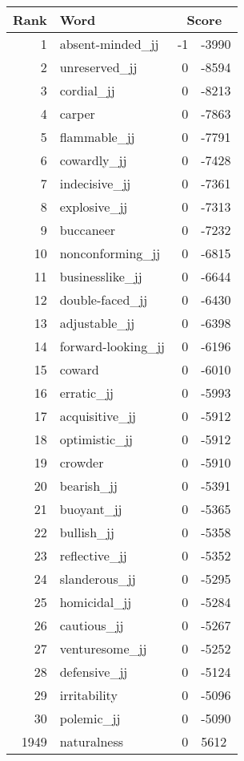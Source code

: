 \begin{longtable}[!htbp]{| rlr@{.}l |}
    \hline
    \textbf{Rank} & \textbf{Word} & \multicolumn{2}{c|}{\textbf{Score}} \\
    \hline
    \endhead
    1 & absent-minded\_jj & -1 & -3990 \\
    2 & unreserved\_jj & 0 & -8594 \\
    3 & cordial\_jj & 0 & -8213 \\
    4 & carper & 0 & -7863 \\
    5 & flammable\_jj & 0 & -7791 \\
    6 & cowardly\_jj & 0 & -7428 \\
    7 & indecisive\_jj & 0 & -7361 \\
    8 & explosive\_jj & 0 & -7313 \\
    9 & buccaneer & 0 & -7232 \\
    10 & nonconforming\_jj & 0 & -6815 \\
    11 & businesslike\_jj & 0 & -6644 \\
    12 & double-faced\_jj & 0 & -6430 \\
    13 & adjustable\_jj & 0 & -6398 \\
    14 & forward-looking\_jj & 0 & -6196 \\
    15 & coward & 0 & -6010 \\
    16 & erratic\_jj & 0 & -5993 \\
    17 & acquisitive\_jj & 0 & -5912 \\
    18 & optimistic\_jj & 0 & -5912 \\
    19 & crowder & 0 & -5910 \\
    20 & bearish\_jj & 0 & -5391 \\
    21 & buoyant\_jj & 0 & -5365 \\
    22 & bullish\_jj & 0 & -5358 \\
    23 & reflective\_jj & 0 & -5352 \\
    24 & slanderous\_jj & 0 & -5295 \\
    25 & homicidal\_jj & 0 & -5284 \\
    26 & cautious\_jj & 0 & -5267 \\
    27 & venturesome\_jj & 0 & -5252 \\
    28 & defensive\_jj & 0 & -5124 \\
    29 & irritability & 0 & -5096 \\
    30 & polemic\_jj & 0 & -5090 \\
    1949 & naturalness & 0 & 5612 \\

\end{longtable}
